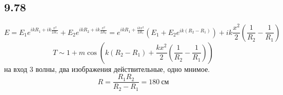 \subsection*{9.78}
$$E = E_1 e^{ik R_1 + ik \frac{x^2}{2R_1}} + E_2 e^{ik R_2 + ik \frac{x^2}{2R_2}} = e^{i k R_1 + \frac{ikx^2}{2R_1}} (E_1 + E_2 e^{ik (R_2 -R_1)}) + ik \frac{x^2}{2} (\frac{1}{R_2} - \frac{1}{R_1})$$
$$T \sim 1 + m\cos (k(R_2 - R_1) + \frac{k x^2}{2} (\frac{1}{R_2} - \frac{1}{R_1}))$$
на вход 3 волны, два изображения действительные, одно мнимое.
$$R = \frac{R_1 R_2}{R_2 -R_1} = 180 \ см$$